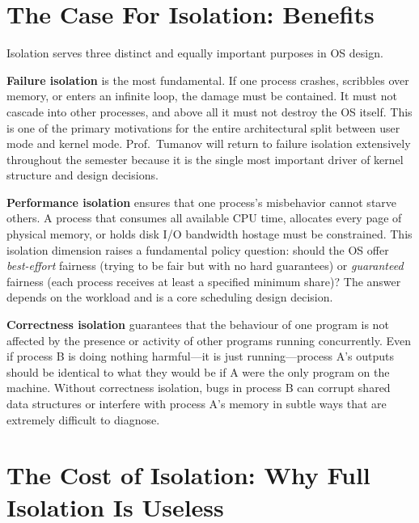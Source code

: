 \documentclass[11pt]{article}
\begin{document}
\section{The Case For Isolation: Benefits}

Isolation serves three distinct and equally important purposes in OS design.

\textbf{Failure isolation} is the most fundamental. If one process crashes, scribbles
over memory, or enters an infinite loop, the damage must be contained. It must not cascade
into other processes, and above all it must not destroy the OS itself. This is one of the
primary motivations for the entire architectural split between user mode and kernel mode.
Prof.\ Tumanov will return to failure isolation extensively throughout the semester because
it is the single most important driver of kernel structure and design decisions.

\textbf{Performance isolation} ensures that one process's misbehavior cannot starve others.
A process that consumes all available CPU time, allocates every page of physical memory, or
holds disk I/O bandwidth hostage must be constrained. This isolation dimension raises a
fundamental policy question: should the OS offer \emph{best-effort} fairness (trying to be
fair but with no hard guarantees) or \emph{guaranteed} fairness (each process receives at
least a specified minimum share)? The answer depends on the workload and is a core
scheduling design decision.

\textbf{Correctness isolation} guarantees that the behaviour of one program is not affected
by the presence or activity of other programs running concurrently. Even if process B is
doing nothing harmful---it is just running---process A's outputs should be identical to what
they would be if A were the only program on the machine. Without correctness isolation, bugs
in process B can corrupt shared data structures or interfere with process A's memory in
subtle ways that are extremely difficult to diagnose.

\section{The Cost of Isolation: Why Full Isolation Is Useless}
\end{document}
